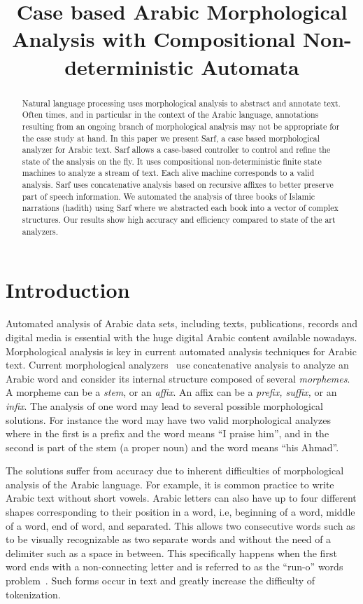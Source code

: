 \documentclass[11pt,letterpaper]{article}
\title{Case based Arabic Morphological Analysis with 
    Compositional Non-deterministic Automata }
\date{}
\begin{document}
\maketitle

\begin{abstract}
Natural language processing uses morphological 
analysis to abstract and annotate text.
Often times, and in particular in the context
of the Arabic language, annotations resulting from 
an ongoing branch of morphological analysis may not be
appropriate for the case study at hand. 
In this paper we present Sarf, a case based morphological 
analyzer for Arabic text. 
Sarf allows a case-based controller to control and refine
the state of the analysis on the fly. 
It uses compositional non-deterministic finite state machines 
to analyze a stream of text. 
Each alive machine corresponds to a valid analysis. 
Sarf uses concatenative analysis based on recursive affixes 
to better preserve part of speech information.
We automated the analysis of three books of Islamic
narrations (hadith) using Sarf where we
abstracted each book into a vector of complex structures.
Our results show high accuracy and efficiency compared to
state of the art analyzers. 
\end{abstract}

\section{Introduction}

Automated analysis of Arabic data sets, including texts, 
publications, records and digital media is essential
with the huge digital Arabic content available nowadays. 
Morphological analysis is key in current automated 
analysis techniques for Arabic text. 
Current morphological analyzers~\cite{Sughaiyer:04}
use concatenative analysis
to analyze an Arabic word and
consider its internal structure composed of several
{\em morphemes}. A morpheme can be a {\em stem}, or an {\em affix}.
An affix can be a {\em prefix, suffix, } or an {\em infix}.
The analysis of one word may lead to several possible
morphological solutions.
\vocalize
For instance the word  
may have two valid morphological analyzes where in the first
 is a prefix and the word means ``I praise him'',
and in the second  is part of the stem 
 (a proper noun)
and the word means ``his Ahmad''.

\novocalize
The solutions suffer from accuracy due to inherent difficulties
of morphological analysis of the Arabic language. 
For example, it is common practice to write Arabic text
without short vowels. 
Arabic letters can also have up to four different shapes 
corresponding to their position in a word, i.e, beginning of 
a word, middle of a word, end of word, and separated. 
This allows two consecutive words such as 
to be visually recognizable
as two separate words  and  without 
the need of a delimiter such as a space in between. 
This specifically happens when the first word ends with
a non-connecting letter and is referred to as the ``run-o'' words
problem~\cite{Buckwalter:04}.
Such forms occur in text and greatly increase the
difficulty of tokenization.
\end{document}
